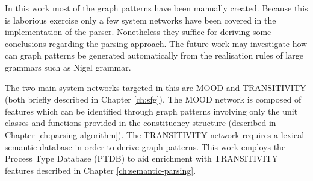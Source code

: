 In this work most of the graph patterns have been manually created. Because this is laborious exercise only a few system networks have been covered in the implementation of the parser. Nonetheless they suffice for deriving some conclusions regarding the parsing approach. The future work may investigate how can graph patterns be generated automatically from the realisation rules of large grammars such as Nigel grammar. 

The two main system networks targeted in this are MOOD and TRANSITIVITY (both briefly described in Chapter \ref{ch:sfg}). The MOOD network is composed of features which can be identified through graph patterns involving only the unit classes and functions provided in the constituency structure (described in Chapter \ref{ch:parsing-algorithm}). The TRANSITIVITY network requires a lexical-semantic database in order to derive graph patterns. This work employs the Process Type Database (PTDB) \citep{Neale2002} to aid enrichment with TRANSITIVITY features described in Chapter \ref{ch:semantic-parsing}.  










